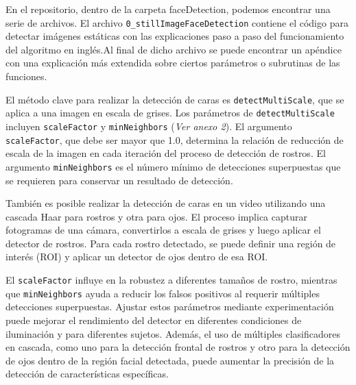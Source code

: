 \documentclass[a4paper]{article}
\begin{document}
En el repositorio, dentro de la carpeta faceDetection, podemos encontrar una serie de archivos. El archivo \texttt{0\_stillImageFaceDetection} contiene el código para detectar imágenes estáticas con las explicaciones paso a paso del funcionamiento del algoritmo en inglés.Al final de dicho archivo se puede encontrar un apéndice con una explicación más extendida sobre ciertos parámetros o subrutinas de las funciones.

El método clave para realizar la detección de caras es \texttt{detectMultiScale}, que se aplica a una imagen en escala de grises. Los parámetros de \texttt{detectMultiScale} incluyen \texttt{scaleFactor} y \texttt{minNeighbors} (\textit{Ver anexo 2}). El argumento \texttt{scaleFactor}, que debe ser mayor que 1.0, determina la relación de reducción de escala de la imagen en cada iteración del proceso de detección de rostros. El argumento \texttt{minNeighbors} es el número mínimo de detecciones superpuestas que se requieren para conservar un resultado de detección.

También es posible realizar la detección de caras en un video utilizando una cascada Haar para rostros y otra para ojos. El proceso implica capturar fotogramas de una cámara, convertirlos a escala de grises y luego aplicar el detector de rostros. Para cada rostro detectado, se puede definir una región de interés (ROI) y aplicar un detector de ojos dentro de esa ROI.

El \texttt{scaleFactor} influye en la robustez a diferentes tamaños de rostro, mientras que \texttt{minNeighbors} ayuda a reducir los falsos positivos al requerir múltiples detecciones superpuestas. Ajustar estos parámetros mediante experimentación puede mejorar el rendimiento del detector en diferentes condiciones de iluminación y para diferentes sujetos. Además, el uso de múltiples clasificadores en cascada, como uno para la detección frontal de rostros y otro para la detección de ojos dentro de la región facial detectada, puede aumentar la precisión de la detección de características específicas.
\end{document}
